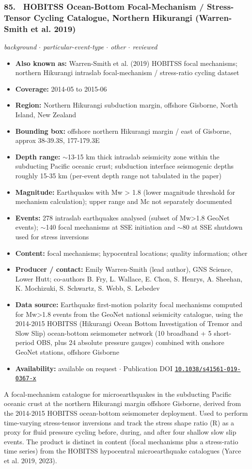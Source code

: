 \documentclass[10pt,a4paper]{article}
\newcommand{\kv}[2]{\item \textbf{#1:} #2}
\begin{document}
\subsubsection*{\hypertarget{c:85}{85.}~ HOBITSS Ocean-Bottom Focal-Mechanism / Stress-Tensor Cycling Catalogue, Northern Hikurangi (Warren-Smith et al. 2019)}
{\small\itshape background $\cdot$ particular-event-type $\cdot$ other $\cdot$ reviewed}\par\vspace{2pt}
\begin{itemize}[leftmargin=1.3em,itemsep=0.6pt,topsep=1pt,parsep=0pt]
\kv{Also known as}{Warren-Smith et al. (2019) HOBITSS focal mechanisms; northern Hikurangi intraslab focal-mechanism / stress-ratio cycling dataset}
\kv{Coverage}{2014-05 to 2015-06}
\kv{Region}{Northern Hikurangi subduction margin, offshore Gisborne, North Island, New Zealand}
\kv{Bounding box}{offshore northern Hikurangi margin / east of Gisborne, approx 38-39.3S, 177-179.3E}
\kv{Depth range}{$\sim$13-15 km thick intraslab seismicity zone within the subducting Pacific oceanic crust; subduction interface seismogenic depths roughly 15-35 km (per-event depth range not tabulated in the paper)}
\kv{Magnitude}{Earthquakes with Mw \textgreater{} 1.8 (lower magnitude threshold for mechanism calculation); upper range and Mc not separately documented}
\kv{Events}{278 intraslab earthquakes analysed (subset of Mw\textgreater{}1.8 GeoNet events); $\sim$140 focal mechanisms at SSE initiation and $\sim$80 at SSE shutdown used for stress inversions}
\kv{Content}{focal mechanisms; hypocentral locations; quality information; other}
\kv{Producer / contact}{Emily Warren-Smith (lead author), GNS Science, Lower Hutt; co-authors B. Fry, L. Wallace, E. Chon, S. Henrys, A. Sheehan, K. Mochizuki, S. Schwartz, S. Webb, S. Lebedev}
\kv{Data source}{Earthquake first-motion polarity focal mechanisms computed for Mw\textgreater{}1.8 events from the GeoNet national seismicity catalogue, using the 2014-2015 HOBITSS (Hikurangi Ocean Bottom Investigation of Tremor and Slow Slip) ocean-bottom seismometer network (10 broadband + 5 short-period OBS, plus 24 absolute pressure gauges) combined with onshore GeoNet stations, offshore Gisborne}
\kv{Availability}{available on request $\cdot$ Publication DOI \href{https://doi.org/10.1038/s41561-019-0367-x}{\nolinkurl{10.1038/s41561-019-0367-x}}}
\end{itemize}
\par\vspace{2pt}A focal-mechanism catalogue for microearthquakes in the subducting Pacific oceanic crust at the northern Hikurangi margin offshore Gisborne, derived from the 2014-2015 HOBITSS ocean-bottom seismometer deployment. Used to perform time-varying stress-tensor inversions and track the stress shape ratio (R) as a proxy for fluid pressure cycling before, during, and after four shallow slow slip events. The product is distinct in content (focal mechanisms plus a stress-ratio time series) from the HOBITSS hypocentral microearthquake catalogues (Yarce et al. 2019, 2023).
\end{document}
